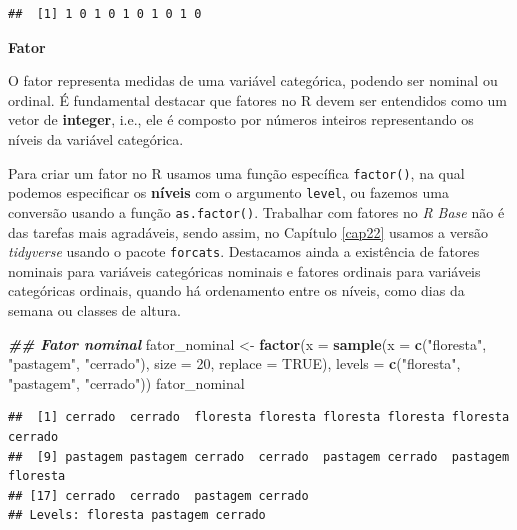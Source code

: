 \documentclass[
]{article}
\newenvironment{Shaded}{\begin{snugshade}}{\end{snugshade}}
\newcommand{\AttributeTok}[1]{\textcolor[rgb]{0.13,0.29,0.53}{#1}}
\newcommand{\ConstantTok}[1]{\textcolor[rgb]{0.56,0.35,0.01}{#1}}
\newcommand{\DecValTok}[1]{\textcolor[rgb]{0.00,0.00,0.81}{#1}}
\newcommand{\DocumentationTok}[1]{\textcolor[rgb]{0.56,0.35,0.01}{\textbf{\textit{#1}}}}
\newcommand{\FunctionTok}[1]{\textcolor[rgb]{0.13,0.29,0.53}{\textbf{#1}}}
\newcommand{\NormalTok}[1]{#1}
\newcommand{\OtherTok}[1]{\textcolor[rgb]{0.56,0.35,0.01}{#1}}
\newcommand{\StringTok}[1]{\textcolor[rgb]{0.31,0.60,0.02}{#1}}
\begin{document}
\begin{verbatim}
##  [1] 1 0 1 0 1 0 1 0 1 0
\end{verbatim}

\textbf{Fator}

O fator representa medidas de uma variável categórica, podendo ser nominal ou ordinal. É fundamental destacar que fatores no R devem ser entendidos como um vetor de \textbf{integer}, i.e., ele é composto por números inteiros representando os níveis da variável categórica.

Para criar um fator no R usamos uma função específica \texttt{factor()}, na qual podemos especificar os \textbf{níveis} com o argumento \texttt{level}, ou fazemos uma conversão usando a função \texttt{as.factor()}. Trabalhar com fatores no \emph{R Base} não é das tarefas mais agradáveis, sendo assim, no Capítulo \ref{cap22} usamos a versão \emph{tidyverse} usando o pacote \texttt{forcats}. Destacamos ainda a existência de fatores nominais para variáveis categóricas nominais e fatores ordinais para variáveis categóricas ordinais, quando há ordenamento entre os níveis, como dias da semana ou classes de altura.

\begin{Shaded}
\begin{Highlighting}[]
\DocumentationTok{\#\# Fator nominal}
\NormalTok{fator\_nominal }\OtherTok{\textless{}{-}} \FunctionTok{factor}\NormalTok{(}\AttributeTok{x =} \FunctionTok{sample}\NormalTok{(}\AttributeTok{x =} \FunctionTok{c}\NormalTok{(}\StringTok{"floresta"}\NormalTok{, }\StringTok{"pastagem"}\NormalTok{, }\StringTok{"cerrado"}\NormalTok{), }
                                   \AttributeTok{size =} \DecValTok{20}\NormalTok{, }\AttributeTok{replace =} \ConstantTok{TRUE}\NormalTok{),}
                        \AttributeTok{levels =} \FunctionTok{c}\NormalTok{(}\StringTok{"floresta"}\NormalTok{, }\StringTok{"pastagem"}\NormalTok{, }\StringTok{"cerrado"}\NormalTok{))}
\NormalTok{fator\_nominal}
\end{Highlighting}
\end{Shaded}

\begin{verbatim}
##  [1] cerrado  cerrado  floresta floresta floresta floresta floresta cerrado 
##  [9] pastagem pastagem cerrado  cerrado  pastagem cerrado  pastagem floresta
## [17] cerrado  cerrado  pastagem cerrado 
## Levels: floresta pastagem cerrado
\end{verbatim}
\end{document}
